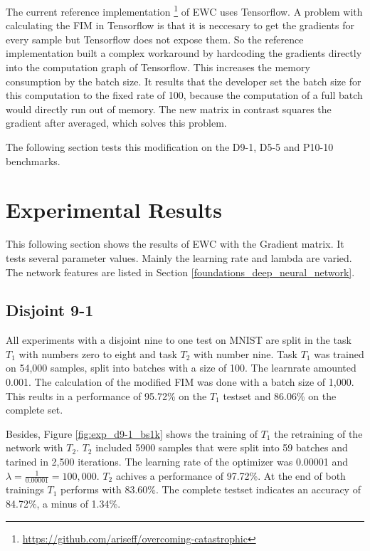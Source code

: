 The current reference implementation \footnote[1]{\url{https://github.com/ariseff/overcoming-catastrophic}} of EWC uses Tensorflow.
A problem with calculating the FIM in Tensorflow is that it is neccesary to get the gradients for every sample but Tensorflow does not expose them.
So the reference implementation built a complex workaround by hardcoding the gradients directly into the computation graph of Tensorflow.
This increases the memory consumption by the batch size.
It results that the developer set the batch size for this computation to the fixed rate of 100, because the computation of a full batch would directly run out of memory.
\cite{github_ewc_issue_one}
The new matrix in contrast squares the gradient after averaged, which solves this problem.

The following section tests this modification on the D9-1, D5-5 and P10-10 benchmarks.

\newpage
\section{Experimental Results}

This following section shows the results of EWC with the Gradient matrix.
It tests several parameter values.
Mainly the learning rate and lambda are varied.
The network features are listed in Section \ref{foundations_deep_neural_network}.

\subsection{Disjoint 9-1}

All experiments with a disjoint nine to one test on MNIST are split in the task $T_1$ with numbers zero to eight and task $T_2$ with number nine.
Task $T_1$ was trained on 54,000 samples, split into batches with a size of 100.
The learnrate amounted 0.001.
The calculation of the modified FIM was done with a batch size of 1,000.
This reults in a performance of 95.72\% on the $T_1$ testset and 86.06\% on the complete set.

Besides, Figure \ref{fig:exp_d9-1_bs1k} shows the training of $T_1$ the retraining of the network with $T_2$.
$T_2$ included 5900 samples that were split into 59 batches and tarined in 2,500 iterations.
The learning rate of the optimizer was 0.00001 and $\lambda = \frac{1}{0.00001} = 100,000$.
$T_2$ achives a performance of 97.72\%.
At the end of both trainings $T_1$ performs with 83.60\%.
The complete testset indicates an accuracy of 84.72\%, a minus of 1.34\%.

